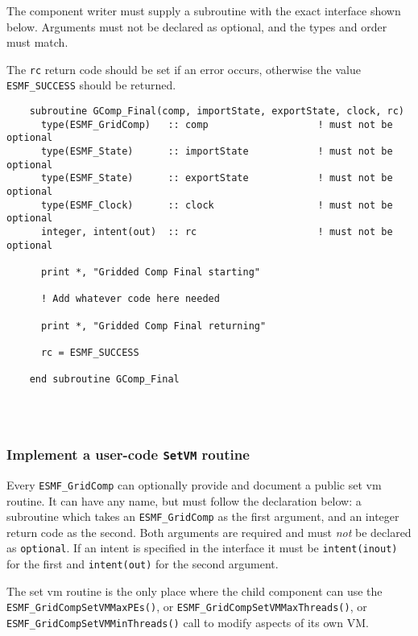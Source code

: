    The component writer must supply a subroutine with the exact interface 
   shown below. Arguments must not be declared as optional, and the types and
   order must match.
  
   The {\tt rc} return code should be set if an error occurs, otherwise
   the value {\tt ESMF\_SUCCESS} should be returned.
   

 \begin{verbatim}
    subroutine GComp_Final(comp, importState, exportState, clock, rc)
      type(ESMF_GridComp)   :: comp                   ! must not be optional
      type(ESMF_State)      :: importState            ! must not be optional
      type(ESMF_State)      :: exportState            ! must not be optional
      type(ESMF_Clock)      :: clock                  ! must not be optional
      integer, intent(out)  :: rc                     ! must not be optional

      print *, "Gridded Comp Final starting"
    
      ! Add whatever code here needed

      print *, "Gridded Comp Final returning"
   
      rc = ESMF_SUCCESS

    end subroutine GComp_Final
 
\end{verbatim}
 
 
\mbox{}\hrulefill\ 
 

  \subsubsection{Implement a user-code {\tt SetVM} routine}
   
   \label{sec:GridSetVM}
  
   Every {\tt ESMF\_GridComp} can optionally provide and document
   a public set vm routine.  It can have any name, but must
   follow the declaration below: a subroutine which takes an
   {\tt ESMF\_GridComp} as the first argument, and
   an integer return code as the second.
   Both arguments are required and must {\em not} be declared as 
   {\tt optional}. If an intent is specified in the interface it must be 
   {\tt intent(inout)} for the first and {\tt intent(out)} for the 
   second argument.
  
   The set vm routine is the only place where the child component can
   use the {\tt ESMF\_GridCompSetVMMaxPEs()}, or
   {\tt ESMF\_GridCompSetVMMaxThreads()}, or 
   {\tt ESMF\_GridCompSetVMMinThreads()} call to modify aspects of its own VM.
  
